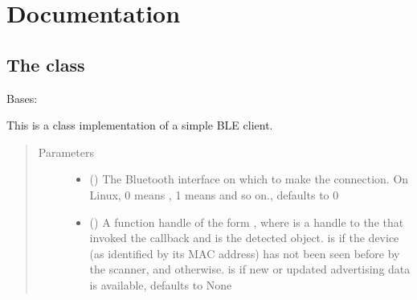 \documentclass[letterpaper,10pt,english]{sphinxmanual}
\begin{document}
\chapter{Documentation}
\label{\detokenize{simpleble:documentation}}\label{\detokenize{simpleble::doc}}

\section{The  class}
\label{\detokenize{simpleble:the-simplebleclient-class}}

\begin{fulllineitems}
\label{\detokenize{simpleble:simpleble.SimpleBleClient}}
Bases: 

This is a class implementation of a simple BLE client.
\begin{quote}\begin{description}
\item[{Parameters}] \leavevmode\begin{itemize}
\item {} 
 (\sphinxstyleliteralemphasis{\sphinxupquote{, }}) \textendash{} The Bluetooth interface on which to make the connection. On Linux, 0 means , 1 means  and so on., defaults to 0

\item {} 
 (\sphinxstyleliteralemphasis{\sphinxupquote{, }}) \textendash{} A function handle of the form , where  is a handle to the {\hyperref[\detokenize{simpleble:simpleble.SimpleBleClient}]{}} that invoked the callback and  is the detected {\hyperref[\detokenize{simpleble:simpleble.SimpleBleDevice}]{}} object.  is  if the device (as identified by its MAC address) has not been seen before by the scanner, and  otherwise.  is  if new or updated advertising data is available, defaults to None


\end{itemize}
\end{description}
\end{quote}
\end{fulllineitems}
\end{document}
